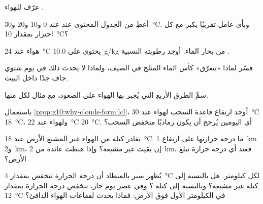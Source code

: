 \begin{exercise}[$\star$]\label{exo:g10:why-clouds-form:1}
عرّف  للهواء .
\end{exercise}

\begin{exercise}[$\star$]\label{exo:g10:why-clouds-form:2}
أعطِ من الجدول المحتوى عند  عند \num{0} و\num{10}
و\num{20} و\qty{30}{\degreeCelsius}. وبأي عامل تقريبًا يكبر مع كل
احترار بمقدار \qty{10}{\degreeCelsius}؟
\end{exercise}

\begin{exercise}[$\star$]\label{exo:g10:why-clouds-form:3}
هواء عند \qty{24}{\degreeCelsius} يحتوي على \qty{10.0}{g/kg} من بخار الماء.
أوجد رطوبته النسبية .
\end{exercise}

\begin{exercise}[$\star$]\label{exo:g10:why-clouds-form:4}
فسّر لماذا «تتعرّق» كأس الماء المثلج في الصيف، ولماذا لا يحدث ذلك في يوم شتوي
جاف جدًا داخل البيت.
\end{exercise}

\begin{exercise}[$\star$]\label{exo:g10:why-clouds-form:5}
سمِّ الطرق الأربع التي يُجبر بها الهواء على الصعود، مع مثال لكل منها.
\end{exercise}

\begin{exercise}[$\star\star$]\label{exo:g10:why-clouds-form:6}
باستعمال \cref{prop:g10:why-clouds-form:lcl}، أوجد ارتفاع قاعدة السحب لهواء
عند \qty{30}{\degreeCelsius} 
\qty{18}{\degreeCelsius}، ولهواء عند \qty{22}{\degreeCelsius}  \qty{20}{\degreeCelsius}. أي اليومين يُرجح أن يكون رماديًا منخفض السحب؟
\end{exercise}

\begin{exercise}[$\star\star$]\label{exo:g10:why-clouds-form:7}
تغادر كتلة من الهواء غير المشبع الأرض عند \qty{18}{\degreeCelsius}.
ما درجة حرارتها على ارتفاع \qty{1}{km} و\qty{2}{km}، إن بقيت
غير مشبعة؟ وإذا هبطت عائدة من \qty{2}{km}، فعند أي درجة حرارة تبلغ
الأرض؟
\end{exercise}

\begin{exercise}[$\star\star$]\label{exo:g10:why-clouds-form:8}
يُظهر سبر بالمنطاد أن درجة الحرارة تنخفض بمقدار \qty{4}{\degreeCelsius}
لكل كيلومتر. هل  بالنسبة إلى كتلة غير مشبعة؟ وبالنسبة إلى كتلة ؟
وفي عصر يوم حار، تنخفض درجة الحرارة بمقدار \qty{12}{\degreeCelsius} في
الكيلومتر الأول فوق الأرض: فماذا يحدث لفقاعات الهواء الدافئ؟
\end{exercise}

